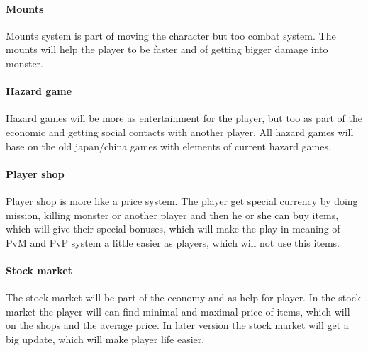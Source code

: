 \documentclass[parskip=full]{scrartcl}
\begin{document}
					\paragraph{Mounts} \vspace{-5mm}
						\par \begingroup
						\leftskip=2cm
						\noindent
								Mounts system is part of moving the character but too combat system. The mounts will help the player to be faster and of getting bigger damage into monster.
						\par \endgroup
					\paragraph{Hazard game} \vspace{-5mm}
						\par \begingroup
						\leftskip=2cm
						\noindent
								Hazard games will be more as entertainment for the player, but too as part of the economic and getting social contacts with another player. All hazard games will base on the old japan/china games with elements of current hazard games. 
						\par \endgroup
					\paragraph{Player shop} \vspace{-5mm}
						\par \begingroup
						\leftskip=2cm
						\noindent
								Player shop is more like a price system. The player get special currency by doing mission, killing monster or another player and then he or she can buy items, which will give their special bonuses, which will make the play in meaning of PvM and PvP system a little easier as players, which will not use this items.
						\par \endgroup
					\paragraph{Stock market} \vspace{-5mm}
						\par \begingroup
						\leftskip=2cm
						\noindent
								The stock market will be part of the economy and as help for player. In the stock market the player will can find minimal and maximal price of items, which will on the shops and the average price. In later version the stock market will get a big update, which will make player life easier.
						\par \endgroup
\end{document}
